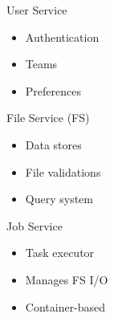 \documentclass[landscape,paperwidth=70in,paperheight=46in,fontscale=0.225]{baposter} %
\begin{document}
\begin{poster}
{\vspace{5mm}
\noindent 
\begin{minipage}[t]{0.32\columnwidth}
User Service

\begin{itemize}[leftmargin=*,noitemsep,topsep=0pt]
	\item Authentication
	\item Teams
	\item Preferences
\end{itemize}
\end{minipage}
\hfill
\noindent
\begin{minipage}[t]{0.32\columnwidth}
File Service (FS)

\begin{itemize}[leftmargin=*,noitemsep,topsep=0pt]
	\item Data stores
	\item File validations
	\item Query system
\end{itemize}

\end{minipage}
\hfill
\noindent
\begin{minipage}[t]{0.32\columnwidth}
Job Service
\begin{itemize}[leftmargin=*,noitemsep,topsep=0pt]
	\item Task executor
	\item Manages FS I/O
	\item Container-based 

\end{itemize}

\end{minipage}
}


%          


\end{poster}
\end{document}
